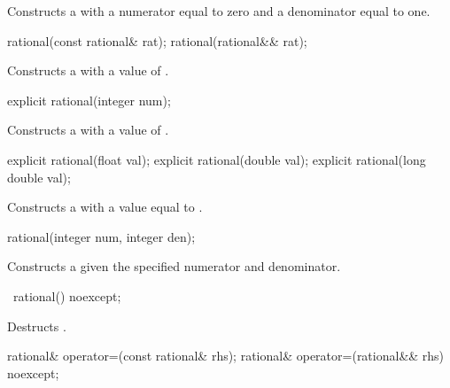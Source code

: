\begin{itemdescr}
\effects Constructs a  with a numerator equal to zero and a denominator equal to one.
\end{itemdescr}

\begin{itemdecl}
rational(const rational& rat);
rational(rational&& rat);
\end{itemdecl}

\begin{itemdescr}
\effects Constructs a  with a value of .
\end{itemdescr}

\begin{itemdecl}
explicit rational(integer num);
\end{itemdecl}

\begin{itemdescr}
\effects Constructs a  with a value of .
\end{itemdescr}

\begin{itemdecl}
explicit rational(float val);
explicit rational(double val);
explicit rational(long double val);
\end{itemdecl}

\begin{itemdescr}
\effects Constructs a  with a value equal to .
\end{itemdescr}

\begin{itemdecl}
rational(integer num, integer den);
\end{itemdecl}

\begin{itemdescr}
\requires {}
\effects Constructs a  given the specified numerator and denominator.
\end{itemdescr}

\begin{itemdecl}
~rational() noexcept;
\end{itemdecl}

\begin{itemdescr}
\effects Destructs .
\end{itemdescr}

\begin{itemdecl}
rational& operator=(const rational& rhs);
rational& operator=(rational&& rhs) noexcept;
\end{itemdecl}

